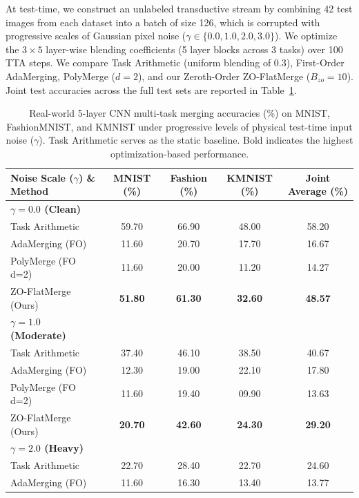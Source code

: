 At test-time, we construct an unlabeled transductive stream by combining 42 test images from each dataset into a batch of size 126, which is corrupted with progressive scales of Gaussian pixel noise ($\gamma \in \{0.0, 1.0, 2.0, 3.0\}$). We optimize the $3 \times 5$ layer-wise blending coefficients (5 layer blocks across 3 tasks) over 100 TTA steps. We compare Task Arithmetic (uniform blending of 0.3), First-Order AdaMerging, PolyMerge ($d=2$), and our Zeroth-Order ZO-FlatMerge ($B_{zo}=10$). Joint test accuracies across the full test sets are reported in Table~\ref{tab:real_cnn_results}.

\begin{table}[h]
\caption{Real-world 5-layer CNN multi-task merging accuracies (\%) on MNIST, FashionMNIST, and KMNIST under progressive levels of physical test-time input noise ($\gamma$). Task Arithmetic serves as the static baseline. Bold indicates the highest optimization-based performance.}
\label{tab:real_cnn_results}
\vskip 0.15in
\begin{center}
\begin{small}
\begin{sc}
\begin{tabular}{lcccc}
\toprule
Noise Scale ($\gamma$) \& Method & MNIST (\%) & Fashion (\%) & KMNIST (\%) & Joint Average (\%) \\
\midrule
\textbf{$\gamma = 0.0$ (Clean)} & & & & \\
Task Arithmetic & 59.70 & 66.90 & 48.00 & 58.20 \\
AdaMerging (FO) & 11.60 & 20.70 & 17.70 & 16.67 \\
PolyMerge (FO d=2) & 11.60 & 20.00 & 11.20 & 14.27 \\
ZO-FlatMerge (Ours) & \textbf{51.80} & \textbf{61.30} & \textbf{32.60} & \textbf{48.57} \\
\midrule
\textbf{$\gamma = 1.0$ (Moderate)} & & & & \\
Task Arithmetic & 37.40 & 46.10 & 38.50 & 40.67 \\
AdaMerging (FO) & 12.30 & 19.00 & 22.10 & 17.80 \\
PolyMerge (FO d=2) & 11.60 & 19.40 & 09.90 & 13.63 \\
ZO-FlatMerge (Ours) & \textbf{20.70} & \textbf{42.60} & \textbf{24.30} & \textbf{29.20} \\
\midrule
\textbf{$\gamma = 2.0$ (Heavy)} & & & & \\
Task Arithmetic & 22.70 & 28.40 & 22.70 & 24.60 \\
AdaMerging (FO) & 11.60 & 16.30 & 13.40 & 13.77 \\

\end{tabular}
\end{sc}
\end{small}
\end{center}
\end{table}
